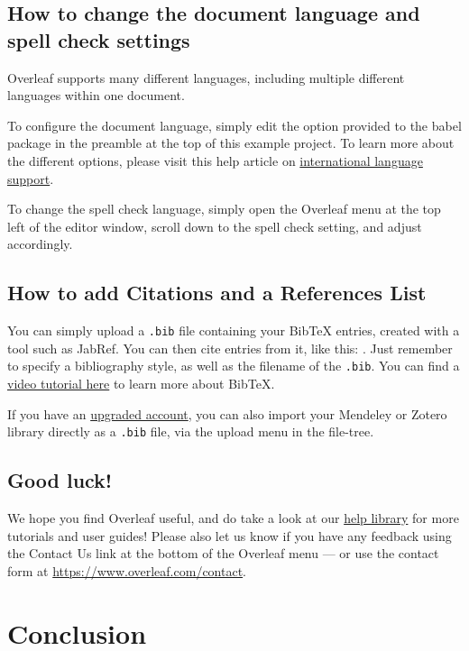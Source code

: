 \documentclass[12pt]{article}
\begin{document}
\subsection{How to change the document language and spell check settings}

Overleaf supports many different languages, including multiple different languages within one document. 

To configure the document language, simply edit the option provided to the babel package in the preamble at the top of this example project. To learn more about the different options, please visit this help article on \href{https://www.overleaf.com/learn/latex/International_language_support}{international language support}.

To change the spell check language, simply open the Overleaf menu at the top left of the editor window, scroll down to the spell check setting, and adjust accordingly.

\subsection{How to add Citations and a References List}

You can simply upload a \verb|.bib| file containing your BibTeX entries, created with a tool such as JabRef. You can then cite entries from it, like this: \cite{greenwade93}. Just remember to specify a bibliography style, as well as the filename of the \verb|.bib|. You can find a \href{https://www.overleaf.com/help/97-how-to-include-a-bibliography-using-bibtex}{video tutorial here} to learn more about BibTeX.

If you have an \href{https://www.overleaf.com/user/subscription/plans}{upgraded account}, you can also import your Mendeley or Zotero library directly as a \verb|.bib| file, via the upload menu in the file-tree.

\subsection{Good luck!}

We hope you find Overleaf useful, and do take a look at our \href{https://www.overleaf.com/learn}{help library} for more tutorials and user guides! Please also let us know if you have any feedback using the Contact Us link at the bottom of the Overleaf menu --- or use the contact form at \url{https://www.overleaf.com/contact}.

\section{Conclusion}



\end{document}
